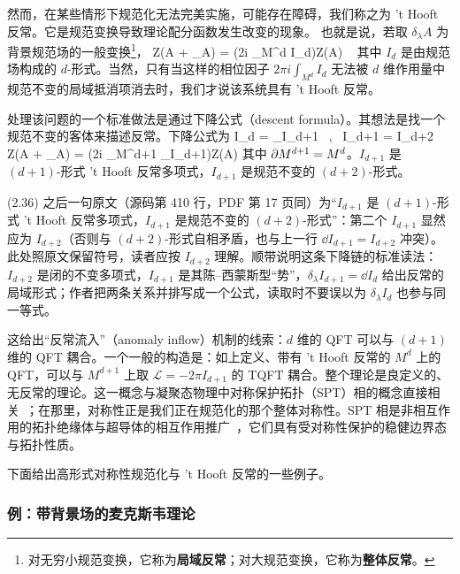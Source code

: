 然而，在某些情形下规范化无法完美实施，可能存在障碍，我们称之为 't Hooft 反常。它是规范变换导致理论配分函数发生改变的现象。
也就是说，若取 $\delta_\lambda A$ 为背景规范场的一般变换\footnote{对无穷小规范变换，它称为\textbf{局域反常}；对大规范变换，它称为\textbf{整体反常}。}，
\be Z(A + \delta_\lambda A) = \exp(2\pi i \int_{M^d} I_d)\cdot  Z(A) \  \ee
其中 $I_d$ 是由规范场构成的 $d$-形式。当然，只有当这样的相位因子 $2\pi i \int_{M^d} I_d$ 无法被 $d$ 维作用量中规范不变的局域抵消项消去时，我们才说该系统具有 't Hooft 反常。

处理该问题的一个标准做法是通过下降公式（descent formula）。其想法是找一个规范不变的客体来描述反常。下降公式为
\be
\ba
\dd I_d = \delta_\lambda I_{d+1} \ , \ \dd I_{d+1}  = I_{d+2} \cr
Z(A + \delta_\lambda A) = \exp(2\pi i \int_{M^{d+1}} \delta_\lambda I_{d+1})\cdot  Z(A)
\ea
\ee
其中 $\partial M^{d+1} = M^d $。$I_{d+1}$ 是 $(d+1)$-形式 't Hooft 反常多项式，$I_{d+1} $ 是规范不变的 $(d+2)$-形式。

\begin{yizhu}[原文疑误]
(2.36) 之后一句原文（源码第 410 行，PDF 第 17 页同）为“$I_{d+1}$ 是 $(d+1)$-形式 't Hooft 反常多项式，$I_{d+1}$ 是规范不变的 $(d+2)$-形式”：第二个 $I_{d+1}$ 显然应为 $I_{d+2}$（否则与 $(d+2)$-形式自相矛盾，也与上一行 $\dd I_{d+1}=I_{d+2}$ 冲突）。此处照原文保留符号，读者应按 $I_{d+2}$ 理解。顺带说明这条下降链的标准读法：$I_{d+2}$ 是闭的不变多项式，$I_{d+1}$ 是其陈–西蒙斯型“势”，$\delta_\lambda I_{d+1}=\dd I_d$ 给出反常的局域形式；作者把两条关系并排写成一个公式，读取时不要误以为 $\delta_\lambda I_d$ 也参与同一等式。
\end{yizhu}

这给出“反常流入”（anomaly inflow）机制的线索：$d$ 维的 QFT 可以与 $(d+1)$ 维的 QFT 耦合。一个一般的构造是：如上定义、带有 't Hooft 反常的 $M^d$ 上的 QFT，可以与 $M^{d+1}$ 上取 $\mathcal{L} = -2\pi I_{d+1}$ 的 TQFT 耦合。整个理论是良定义的、无反常的理论。这一概念与凝聚态物理中对称保护拓扑（SPT）相的概念直接相关~\cite{gu2009tensor,chen2012symmetry,chen2013symmetry,chen2011two,levin2012braiding,PhysRevB.89.035147,chenjie2014,chenjie2015,senthil2015symmetry}；在那里，对称性正是我们正在规范化的那个整体对称性。SPT 相是非相互作用的拓扑绝缘体与超导体的相互作用推广~\cite{TI01,TI02,TI1,TI2,TI3,TI4,TI5}，它们具有受对称性保护的稳健边界态与拓扑性质。

下面给出高形式对称性规范化与 't Hooft 反常的一些例子。

\subsubsection{例：带背景场的麦克斯韦理论}

